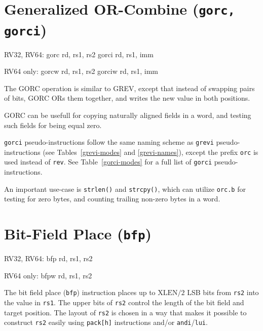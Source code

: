 \section{Generalized OR-Combine (\texttt{gorc, gorci})}

\begin{rvb}
  RV32, RV64:
    gorc  rd, rs1, rs2
    gorci rd, rs1, imm

  RV64 only:
    gorcw  rd, rs1, rs2
    gorciw rd, rs1, imm
\end{rvb}

The GORC operation is similar to GREV, except that instead of swapping pairs of bits,
GORC ORs them together, and writes the new value in both positions.



GORC can be usefull for copying naturally aligned fields in a word, and testing such
fields for being equal zero.

{\tt gorci} pseudo-instructions follow the same naming scheme as {\tt grevi}
pseudo-instructions (see Tables~\ref{grevi-modes} and \ref{grevi-names}),
except the prefix {\tt orc} is used instead of {\tt rev}. See
Table~\ref{gorci-modes} for a full list of {\tt gorci} pseudo-instructions.

An important use-case is {\tt strlen()} and {\tt strcpy()}, which can utilize
{\tt orc.b} for testing for zero bytes, and counting trailing non-zero bytes
in a word.


\section{Bit-Field Place (\texttt{bfp})}

\begin{rvb}
  RV32, RV64:
    bfp rd, rs1, rs2

  RV64 only:
    bfpw rd, rs1, rs2
\end{rvb}

The bit field place ({\tt bfp}) instruction places up to $\mathrm{XLEN}/2$ LSB bits from {\tt rs2} into
the value in {\tt rs1}. The upper bits of {\tt rs2} control the length of the bit field
and target position. The layout of {\tt rs2} is chosen in a way that makes it possible to construct
{\tt rs2} easily using {\tt pack[h]} instructions and/or {\tt andi}/{\tt lui}.




